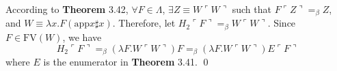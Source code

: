 \begin{pf} \rm
\newcommand{\ncode}[1]{\ulcorner #1\urcorner}
\newcommand{\eqbeta}{=_\beta}
\newcommand{\W}{\lambda x.F(\text{app}x\sharp x)}

According to \textbf{Theorem} 3.42, $\forall F\in\Lambda$, $\exists Z\equiv W\ncode{W}$ such that $F\ncode{Z}\eqbeta Z$, and $W\equiv\W$. Therefore, let $H_2\ncode{F}\eqbeta W\ncode{W}$. Since $F\in\text{FV}(W)$, we have $$H_2\ncode{F}\eqbeta(\lambda F.W\ncode{W})F\eqbeta(\lambda F.W\ncode{W})E\ncode{F}$$ where $E$ is the enumerator in \textbf{Theorem} 3.41. \qed 
\end{pf}
